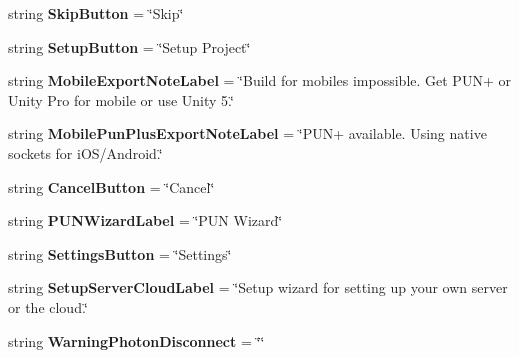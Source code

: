 \begin{DoxyCompactItemize}
\item 
string {\bfseries Skip\+Button} = \char`\"{}Skip\char`\"{}\hypertarget{class_pun_wizard_text_a503099b34e7df57344d72ab814de5931}{}\label{class_pun_wizard_text_a503099b34e7df57344d72ab814de5931}

\item 
string {\bfseries Setup\+Button} = \char`\"{}Setup Project\char`\"{}\hypertarget{class_pun_wizard_text_a8caffc5953e24d8a4895e4842873872d}{}\label{class_pun_wizard_text_a8caffc5953e24d8a4895e4842873872d}

\item 
string {\bfseries Mobile\+Export\+Note\+Label} = \char`\"{}Build for mobiles impossible. Get P\+UN+ or Unity Pro for mobile or use Unity 5.\char`\"{}\hypertarget{class_pun_wizard_text_aebc740e552f294483c01928873c21226}{}\label{class_pun_wizard_text_aebc740e552f294483c01928873c21226}

\item 
string {\bfseries Mobile\+Pun\+Plus\+Export\+Note\+Label} = \char`\"{}P\+UN+ available. Using native sockets for i\+OS/Android.\char`\"{}\hypertarget{class_pun_wizard_text_a018209b0518c1a8ce5c5cc64848d8099}{}\label{class_pun_wizard_text_a018209b0518c1a8ce5c5cc64848d8099}

\item 
string {\bfseries Cancel\+Button} = \char`\"{}Cancel\char`\"{}\hypertarget{class_pun_wizard_text_ad647358b4b8a0519d87fbdeb24a6d6e0}{}\label{class_pun_wizard_text_ad647358b4b8a0519d87fbdeb24a6d6e0}

\item 
string {\bfseries P\+U\+N\+Wizard\+Label} = \char`\"{}P\+UN Wizard\char`\"{}\hypertarget{class_pun_wizard_text_aca0372a55e64a97efa52bf6d9cba5cd9}{}\label{class_pun_wizard_text_aca0372a55e64a97efa52bf6d9cba5cd9}

\item 
string {\bfseries Settings\+Button} = \char`\"{}Settings\char`\"{}\hypertarget{class_pun_wizard_text_a9e1177cd98a9d2882313a00f0e0af5d8}{}\label{class_pun_wizard_text_a9e1177cd98a9d2882313a00f0e0af5d8}

\item 
string {\bfseries Setup\+Server\+Cloud\+Label} = \char`\"{}Setup wizard for setting up your own server or the cloud.\char`\"{}\hypertarget{class_pun_wizard_text_a9241c78a967abc0c2ec06a51d05c43a7}{}\label{class_pun_wizard_text_a9241c78a967abc0c2ec06a51d05c43a7}

\item 
string {\bfseries Warning\+Photon\+Disconnect} = \char`\"{}\char`\"{}\hypertarget{class_pun_wizard_text_a6e14ed66c0cf054099da066b0ff51cd3}{}\label{class_pun_wizard_text_a6e14ed66c0cf054099da066b0ff51cd3}


\end{DoxyCompactItemize}
